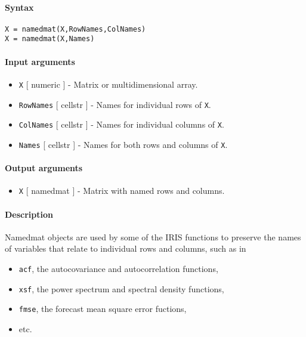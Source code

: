 


	\paragraph{Syntax}\label{syntax}

\begin{verbatim}
X = namedmat(X,RowNames,ColNames)
X = namedmat(X,Names)
\end{verbatim}

\paragraph{Input arguments}\label{input-arguments}

\begin{itemize}
\item
  \texttt{X} {[} numeric {]} - Matrix or multidimensional array.
\item
  \texttt{RowNames} {[} cellstr {]} - Names for individual rows of
  \texttt{X}.
\item
  \texttt{ColNames} {[} cellstr {]} - Names for individual columns of
  \texttt{X}.
\item
  \texttt{Names} {[} cellstr {]} - Names for both rows and columns of
  \texttt{X}.
\end{itemize}

\paragraph{Output arguments}\label{output-arguments}

\begin{itemize}
\itemsep1pt\parskip0pt
\item
  \texttt{X} {[} namedmat {]} - Matrix with named rows and columns.
\end{itemize}

\paragraph{Description}\label{description}

Namedmat objects are used by some of the IRIS functions to preserve the
names of variables that relate to individual rows and columns, such as
in

\begin{itemize}
\itemsep1pt\parskip0pt
\item
  \texttt{acf}, the autocovariance and autocorrelation functions,
\item
  \texttt{xsf}, the power spectrum and spectral density functions,
\item
  \texttt{fmse}, the forecast mean square error fuctions,
\item
  etc.
\end{itemize}

